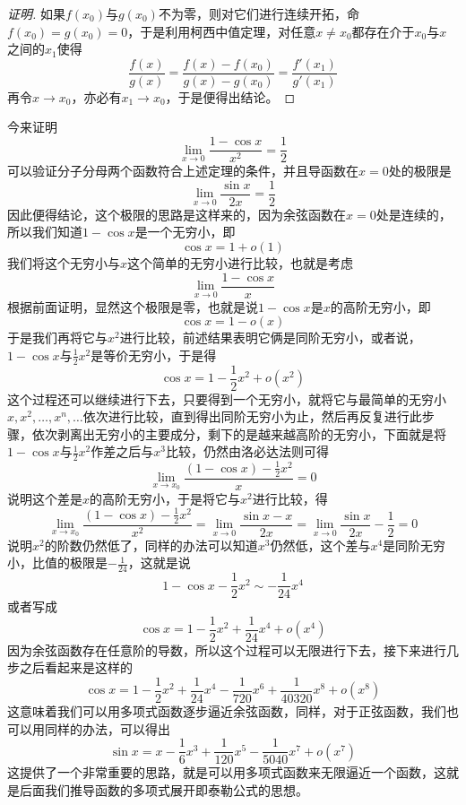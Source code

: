 \begin{proof}[证明]
  如果$f(x_0)$与$g(x_0)$不为零，则对它们进行连续开拓，命$f(x_0)=g(x_0)=0$，于是利用柯西中值定理，对任意$x \neq x_0$都存在介于$x_0$与$x$之间的$x_1$使得
  \[ \frac{f(x)}{g(x)} = \frac{f(x)-f(x_0)}{g(x)-g(x_0)} = \frac{f'(x_1)}{g'(x_1)} \]
  再令$x \to x_0$，亦必有$x_1 \to x_0$，于是便得出结论。
\end{proof}

\begin{example}
  今来证明
  \[ \lim_{x \to 0} \frac{1-\cos{x}}{x^2} = \frac{1}{2} \]
  可以验证分子分母两个函数符合上述定理的条件，并且导函数在$x=0$处的极限是
  \[ \lim_{x \to 0} \frac{\sin{x}}{2x} = \frac{1}{2} \]
  因此便得结论，这个极限的思路是这样来的，因为余弦函数在$x=0$处是连续的，所以我们知道$1-\cos{x}$是一个无穷小，即
  \[ \cos{x} = 1+o(1) \]
  我们将这个无穷小与$x$这个简单的无穷小进行比较，也就是考虑
  \[ \lim_{x \to 0} \frac{1-\cos{x}}{x} \]
  根据前面证明，显然这个极限是零，也就是说$1-\cos{x}$是$x$的高阶无穷小，即
  \[ \cos{x} = 1-o(x) \]
  于是我们再将它与$x^2$进行比较，前述结果表明它俩是同阶无穷小，或者说，$1-\cos{x}$与$\frac{1}{2}x^2$是等价无穷小，于是得
  \[ \cos{x} = 1-\frac{1}{2}x^2 + o(x^2) \]
  这个过程还可以继续进行下去，只要得到一个无穷小，就将它与最简单的无穷小$x,x^2,\ldots,x^n,\ldots$依次进行比较，直到得出同阶无穷小为止，然后再反复进行此步骤，依次剥离出无穷小的主要成分，剩下的是越来越高阶的无穷小，下面就是将$1-\cos{x}$与$\frac{1}{2}x^2$作差之后与$x^3$比较，仍然由洛必达法则可得
  \[ \lim_{x \to x_0} \frac{(1-\cos{x})-\frac{1}{2}x^2}{x} = 0 \]
  说明这个差是$x$的高阶无穷小，于是将它与$x^2$进行比较，得
  \[ \lim_{x \to x_0} \frac{(1-\cos{x})-\frac{1}{2}x^2}{x^2} = \lim_{x \to 0} \frac{\sin{x}-x}{2x} = \lim_{x \to 0} \frac{\sin{x}}{2x} - \frac{1}{2} = 0 \]
  说明$x^2$的阶数仍然低了，同样的办法可以知道$x^3$仍然低，这个差与$x^4$是同阶无穷小，比值的极限是$-\frac{1}{24}$，这就是说
  \[ 1-\cos{x}-\frac{1}{2}x^2 \sim -\frac{1}{24}x^4 \]
  或者写成
  \[ \cos{x} = 1-\frac{1}{2}x^2+\frac{1}{24}x^4 + o(x^4) \]
  因为余弦函数存在任意阶的导数，所以这个过程可以无限进行下去，接下来进行几步之后看起来是这样的
  \[ \cos{x} = 1 - \frac{1}{2}x^2 + \frac{1}{24}x^4 - \frac{1}{720}x^6 + \frac{1}{40320}x^8 + o(x^8) \]
  这意味着我们可以用多项式函数逐步逼近余弦函数，同样，对于正弦函数，我们也可以用同样的办法，可以得出
  \[ \sin{x} = x - \frac{1}{6}x^3 + \frac{1}{120}x^5 - \frac{1}{5040}x^7 + o(x^7) \]
  这提供了一个非常重要的思路，就是可以用多项式函数来无限逼近一个函数，这就是后面我们推导函数的多项式展开即泰勒公式的思想。
\end{example}


